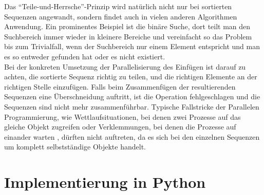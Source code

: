 \par
Das "`Teile-und-Herrsche"'-Prinzip wird natürlich nicht nur bei sortierten Sequenzen angewandt, sondern findet auch in vielen anderen Algorithmen Anwendung. Ein prominentes Beispiel ist die binäre Suche, dort teilt man den Suchbereich immer wieder in kleinere Bereiche und vereinfacht so das Problem bis zum Trivialfall, wenn der Suchbereich nur einem Element entspricht und man es so entweder gefunden hat oder es nicht existiert.
\\
Bei der konkreten Umsetzung der Parallelisierung des Einfügen ist darauf zu achten, die sortierte Sequenz richtig zu teilen, und die richtigen Elemente an der richtigen Stelle einzufügen. Falls beim Zusammenfügen der resultierenden Sequenzen eine Überschneidung auftritt, ist die Operation fehlgeschlagen und die Sequenzen sind nicht mehr zusammenführbar. Typische Fallstricke der Parallelen Programmierung, wie Wettlaufsituationen, bei denen zwei Prozesse auf das gleiche Objekt zugreifen oder Verklemmungen, bei denen die Prozesse auf einander warten \cite{Boles:08}, dürften nicht auftreten, da es sich bei den einzelnen Sequenzen um komplett selbstständige Objekte handelt.

\chapter{Implementierung in Python}
\label{chapter:implementierung}

